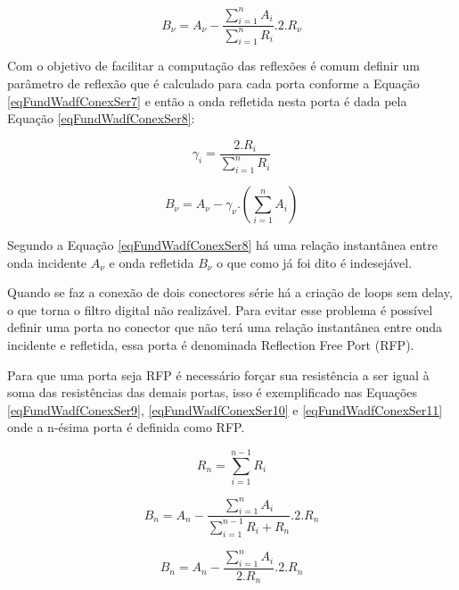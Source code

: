 	\begin{equation}
		\label{eqFundWdfConexSer6}
		B_{\nu} = A_{\nu} -\frac{\sum_{i=1}^{n} A_i}{\sum_{i=1}^{n} R_i}.2.R_{\nu} 
	\end{equation}
	
	Com o objetivo de facilitar a computação das reflexões é comum definir um parâmetro de reflexão que é calculado para cada porta conforme a Equação \ref{eqFundWadfConexSer7} e então a onda refletida nesta porta é dada pela Equação \ref{eqFundWadfConexSer8}:
	
	\begin{equation}
		\label{eqFundWadfConexSer7}
		\gamma_i = \frac{2.R_i}{\sum_{i=1}^{n} R_i}
	\end{equation}
	
	\begin{equation}
		\label{eqFundWadfConexSer8}
		B_{\nu} = A_{\nu} -\gamma_{\nu}.(\sum_{i=1}^{n} A_i)
	\end{equation}
	
	
	Segundo a Equação \ref{eqFundWadfConexSer8} há uma relação instantânea entre onda incidente $A_{\nu}$ e onda refletida $B_{\nu}$ o que como já foi dito é indesejável. 
	
	Quando se faz a conexão de dois conectores série há a criação de loops sem delay, o que torna o filtro digital não realizável. Para evitar esse problema é possível definir uma porta no conector que não terá uma relação instantânea entre onda incidente e refletida, essa porta é denominada Reflection Free Port (RFP).
	
	Para que uma porta seja RFP é necessário forçar sua resistência a ser igual à soma das resistências das demais portas, isso é exemplificado nas Equações \ref{eqFundWadfConexSer9}, \ref{eqFundWadfConexSer10} e \ref{eqFundWadfConexSer11} onde a n-ésima porta é definida como RFP.
	
	\begin{equation}
		\label{eqFundWadfConexSer12}
		R_n = \sum_{i=1}^{n-1} R_i
	\end{equation}  
	
	\begin{equation}
		\label{eqFundWadfConexSer9}
		B_n = A_n -\frac{\sum_{i=1}^{n} A_i}{\sum_{i=1}^{n-1} R_i+R_n}.2.R_n 
	\end{equation}  
	
	\begin{equation}
		\label{eqFundWadfConexSer10}
		B_n = A_n -\frac{\sum_{i=1}^{n} A_i}{2.R_n}.2.R_n 
	\end{equation}
	
